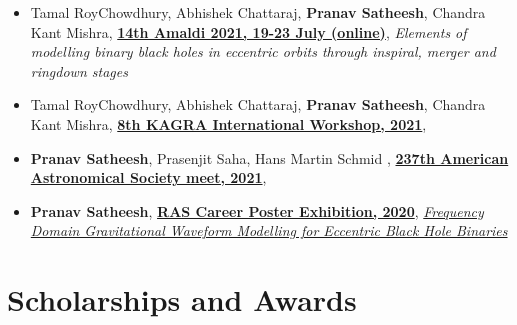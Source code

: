 \documentclass[margin, centered]{res}
\begin{document}
\begin{resume}
\begin{itemize}[leftmargin=*]
    \item Tamal RoyChowdhury, Abhishek Chattaraj, \textbf{Pranav Satheesh}, Chandra Kant Mishra, \href{https://www.amaldi14.org/}{\textbf{14th Amaldi 2021, 19-23 July (online)}}, \textit{Elements of modelling binary black holes in eccentric orbits through inspiral, merger and ringdown stages}\\
    
    \item Tamal RoyChowdhury, Abhishek Chattaraj, \textbf{Pranav Satheesh}, Chandra Kant Mishra, \href{http://kiw8.org/program/}{\textbf{8th KAGRA International Workshop, 2021}}, \href{http://kiw8.org/data/users/348932af5b3e54a8958255b121ccef68/poster/50_pranavsatheesh-poster.pdf}{}
    
    \item \textbf{Pranav Satheesh}, Prasenjit Saha, Hans Martin Schmid , \href{https://aas.org/meetings/aas237}{\textbf{237th American Astronomical Society meet, 2021}}, \href{aas237-aas.ipostersessions.com/Default.aspx?s=79-64-0C-43-B0-53-8B-48-C7-A1-41-CE-DF-A9-70-2A}{}
    
    \item  \textbf{Pranav Satheesh}, \href{https://ras.ac.uk/ras-2020-posters}{\textbf{RAS Career Poster Exhibition, 2020}}, \href{https://ras.ac.uk/poster-contest/pranav-satheesh}{\color{black} {\textit{Frequency Domain Gravitational Waveform Modelling for Eccentric Black Hole Binaries}}}\\ 
    

\end{itemize}   

\section{Scholarships and Awards}
\begin{itemize}[leftmargin=*]


\end{itemize}
\end{resume}
\end{document}
